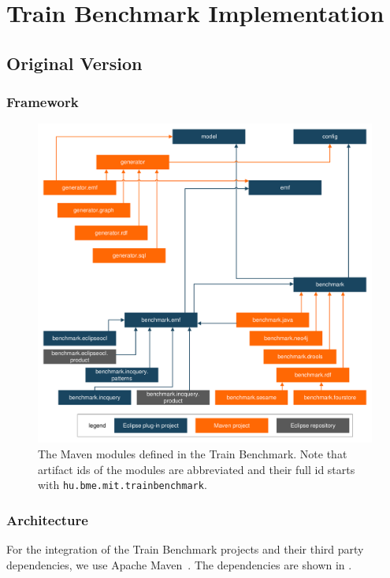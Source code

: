\chapter{Train Benchmark Implementation}

\section{Original Version}

\subsection{Framework}

\begin{figure}[!Htb]
	\centering
	\includegraphics[width=\textwidth]{figures/trainbenchmark-modules}
	\caption{The Maven modules defined in the Train Benchmark. Note that artifact ids of the modules are abbreviated and their full id starts with \texttt{hu.bme.mit.trainbenchmark}.}
	\label{fig:trainbenchmark-modules}
\end{figure}

\subsection{Architecture}

For the integration of the Train Benchmark projects and their third party dependencies, we use Apache Maven~\cite{Maven}. The dependencies are shown in .


